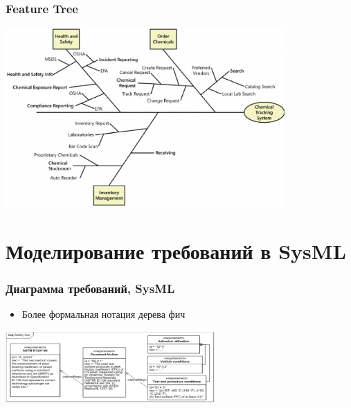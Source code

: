 \documentclass{../cscslides}
\begin{document}
    \begin{frame}
        \frametitle{Feature Tree}
        \begin{center}
            \includegraphics[width=0.8\textwidth]{featureTree.png}
        \end{center}
    \end{frame}

    \section{Моделирование требований в SysML}

    \begin{frame}
        \frametitle{Диаграмма требований, SysML}
        \begin{itemize}
            \item Более формальная нотация дерева фич
        \end{itemize}
        \begin{center}
            \includegraphics[width=0.6\textwidth]{sysMlRequirementDiagram.png}
        \end{center}
    \end{frame}
\end{document}
